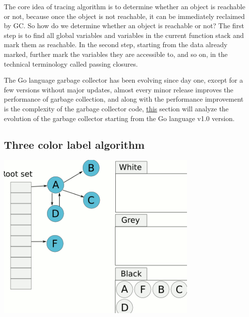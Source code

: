 \documentclass[a4paper]{article}
\theoremstyle{definition}
\begin{document}
The core idea of tracing algorithm is to determine whether an object is reachable or not, because once the object is not reachable, it can be immediately reclaimed by GC. So how do we determine whether an object is reachable or not? The first step is to find all global variables and variables in the current function stack and mark them as reachable. In the second step, starting from the data already marked, further mark the variables they are accessible to, and so on, in the technical terminology called passing closures.

The Go language garbage collector has been evolving since day one, except for a few versions without major updates, almost every minor release improves the performance of garbage collection, and along with the performance improvement is the complexity of the garbage collector code, \href{https://draveness.me/golang/docs/part3-runtime/ch07-memory/golang-garbage-collector/}{this} section will analyze the evolution of the garbage collector starting from the Go language v1.0 version.
\subsection{Three color label algorithm}
 \includegraphics[width=10cm]{img/Snipaste_2021-05-31_17-55-13.png}
\end{document}
